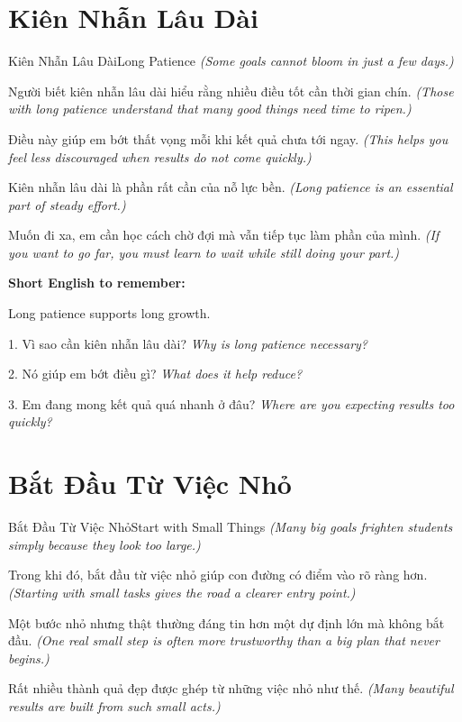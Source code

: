 \section{Kiên Nhẫn Lâu Dài}
\begin{truyen}{Kiên Nhẫn Lâu Dài}{Long Patience}
\textit{(Some goals cannot bloom in just a few days.)}

Người biết kiên nhẫn lâu dài hiểu rằng nhiều điều tốt cần thời gian chín.
\textit{(Those with long patience understand that many good things need time to ripen.)}

Điều này giúp em bớt thất vọng mỗi khi kết quả chưa tới ngay.
\textit{(This helps you feel less discouraged when results do not come quickly.)}

Kiên nhẫn lâu dài là phần rất cần của nỗ lực bền.
\textit{(Long patience is an essential part of steady effort.)}
\end{truyen}

\begin{baihoc}
Muốn đi xa, em cần học cách chờ đợi mà vẫn tiếp tục làm phần của mình.
\textit{(If you want to go far, you must learn to wait while still doing your part.)}
\end{baihoc}

\begin{ghinhoanh}
\textbf{Short English to remember:}

Long patience supports long growth.

\end{ghinhoanh}

\begin{tuhocnhanh}
1. Vì sao cần kiên nhẫn lâu dài? \textit{Why is long patience necessary?}

2. Nó giúp em bớt điều gì? \textit{What does it help reduce?}

3. Em đang mong kết quả quá nhanh ở đâu? \textit{Where are you expecting results too quickly?}
\end{tuhocnhanh}
\ngancach

\section{Bắt Đầu Từ Việc Nhỏ}
\begin{truyen}{Bắt Đầu Từ Việc Nhỏ}{Start with Small Things}
\textit{(Many big goals frighten students simply because they look too large.)}

Trong khi đó, bắt đầu từ việc nhỏ giúp con đường có điểm vào rõ ràng hơn.
\textit{(Starting with small tasks gives the road a clearer entry point.)}

Một bước nhỏ nhưng thật thường đáng tin hơn một dự định lớn mà không bắt đầu.
\textit{(One real small step is often more trustworthy than a big plan that never begins.)}

Rất nhiều thành quả đẹp được ghép từ những việc nhỏ như thế.
\textit{(Many beautiful results are built from such small acts.)}
\end{truyen}

